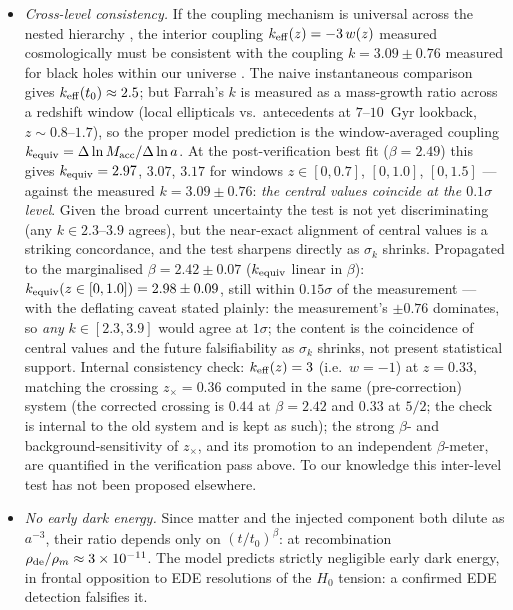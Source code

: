 \documentclass[11pt]{article}
\newcommand{\keff}{k_{\rm eff}}
\begin{document}
\begin{itemize}
\item[P5.] \emph{Cross-level consistency.} If the coupling mechanism is universal across the nested hierarchy \cite{Smolin1997}, the interior coupling $\keff(z) = -3\,w(z)$ measured cosmologically must be consistent with the coupling $k = 3.09 \pm 0.76$ measured for black holes within our universe \cite{Farrah2023}. The naive instantaneous comparison gives $\keff(t_0) \approx 2.5$; but Farrah's $k$ is measured as a mass-growth ratio across a redshift window (local ellipticals vs.\ antecedents at $7$--$10$~Gyr lookback, $z \sim 0.8$--$1.7$), so the proper model prediction is the window-averaged coupling $k_{\rm equiv} = \Delta\ln M_{\rm acc}/\Delta\ln a$. At the post-verification best fit ($\beta = 2.49$) this gives $k_{\rm equiv} = 2.97$, $3.07$, $3.17$ for windows $z \in [0, 0.7]$, $[0, 1.0]$, $[0, 1.5]$ --- against the measured $k = 3.09 \pm 0.76$: \emph{the central values coincide at the $0.1\sigma$ level}. Given the broad current uncertainty the test is not yet discriminating (any $k \in 2.3$--$3.9$ agrees), but the near-exact alignment of central values is a striking concordance, and the test sharpens directly as $\sigma_k$ shrinks. Propagated to the marginalised $\beta = 2.42 \pm 0.07$ ($k_{\rm equiv}$ linear in $\beta$): $k_{\rm equiv}(z\in[0,1.0]) = 2.98 \pm 0.09$, still within $0.15\sigma$ of the measurement --- with the deflating caveat stated plainly: the measurement's $\pm 0.76$ dominates, so \emph{any} $k \in [2.3, 3.9]$ would agree at $1\sigma$; the content is the coincidence of central values and the future falsifiability as $\sigma_k$ shrinks, not present statistical support. Internal consistency check: $\keff(z) = 3$ (i.e.\ $w = -1$) at $z = 0.33$, matching the crossing $z_\times = 0.36$ computed in the same (pre-correction) system (the corrected crossing is $0.44$ at $\beta = 2.42$ and $0.33$ at $5/2$; the check is internal to the old system and is kept as such); the strong $\beta$- and background-sensitivity of $z_\times$, and its promotion to an independent $\beta$-meter, are quantified in the verification pass above. To our knowledge this inter-level test has not been proposed elsewhere.
\item[P6.] \emph{No early dark energy.} Since matter and the injected component both dilute as $a^{-3}$, their ratio depends only on $(t/t_0)^{\beta}$: at recombination $\rho_{\rm de}/\rho_m \approx 3\times10^{-11}$. The model predicts strictly negligible early dark energy, in frontal opposition to EDE resolutions of the $H_0$ tension: a confirmed EDE detection falsifies it.

\end{itemize}
\end{document}
